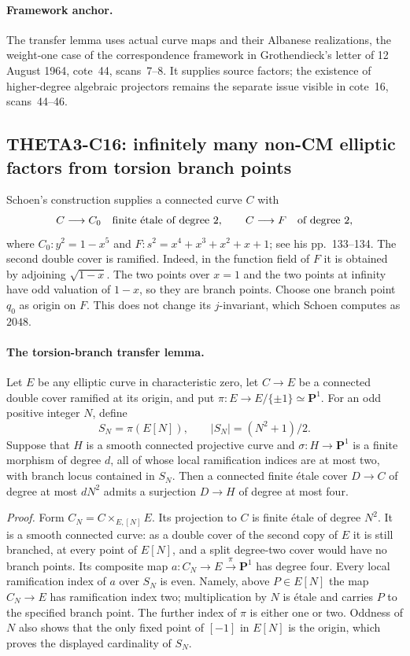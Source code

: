 \paragraph{Framework anchor.}
The transfer lemma uses actual curve maps and their Albanese realizations,
the weight-one case of the correspondence framework in Grothendieck's
letter of 12 August 1964, cote~44, scans~7--8.  It supplies source factors;
the existence of higher-degree algebraic projectors remains the separate
issue visible in cote~16, scans~44--46.

\subsection{THETA3-C16: infinitely many non-CM elliptic factors from torsion branch points}
\label{C16}

Schoen's construction supplies a connected curve $C$ with
\[
 C\longrightarrow C_0 \quad\hbox{finite \'{e}tale of degree }2,
 \qquad C\longrightarrow F \quad\hbox{of degree }2,
\]
where $C_0:y^2=1-x^5$ and
$F:s^2=x^4+x^3+x^2+x+1$; see his pp.~133--134.  The second double cover
is ramified.  Indeed, in the function field of $F$ it is obtained by
adjoining $\sqrt{1-x}$.  The two points over $x=1$ and the two points at
infinity have odd valuation of $1-x$, so they are branch points.
Choose one branch point $q_0$ as origin on $F$.  This does not change its
$j$-invariant, which Schoen computes as $2048$.

\paragraph{The torsion-branch transfer lemma.}
Let $E$ be any elliptic curve in characteristic zero, let $C\to E$ be a
connected double cover ramified at its origin, and put
$\pi:E\to E/\{\pm1\}\simeq\mathbf P^1$.  For an odd positive integer
$N$, define
\[
 S_N=\pi(E[N]),\qquad |S_N|=(N^2+1)/2.
\]
Suppose that $H$ is a smooth connected projective curve and
$\sigma:H\to\mathbf P^1$ is a finite morphism of degree $d$, all of whose
local ramification indices are at most two, with branch locus contained
in $S_N$.  Then a connected finite \'{e}tale cover $D\to C$ of degree
at most $dN^2$ admits a surjection $D\to H$ of degree at most four.

\emph{Proof.}
Form $C_N=C\times_{E,[N]}E$.  Its projection to $C$ is finite \'{e}tale
of degree $N^2$.  It is a smooth connected curve: as a double cover of
the second copy of $E$ it is still branched, at every point of $E[N]$,
and a split degree-two cover would have no branch points.  Its composite
map $a:C_N\to E\xrightarrow{\pi}\mathbf P^1$ has degree four.
Every local ramification index of $a$ over $S_N$ is even.  Namely, above
$P\in E[N]$ the map $C_N\to E$ has ramification index two; multiplication
by $N$ is \'{e}tale and carries $P$ to the specified branch point.
The further index of $\pi$ is either one or two.  Oddness of $N$ also
shows that the only fixed point of $[-1]$ in $E[N]$ is the origin,
which proves the displayed cardinality of $S_N$.

